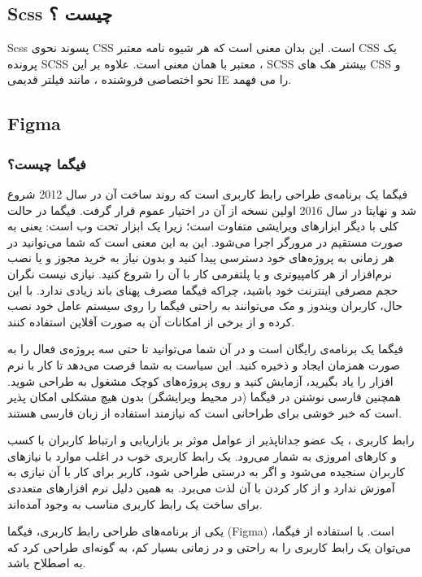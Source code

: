 \subsection{Scss چیست ؟}
Scss پسوند نحوی CSS است. این بدان معنی است که هر شیوه نامه معتبر CSS یک پرونده SCSS معتبر با همان معنی است. علاوه بر این ، SCSS بیشتر هک های CSS و نحو اختصاصی فروشنده ، مانند فیلتر قدیمی IE را می فهمد.


\subsection{Figma}
\subsubsection{فیگما چیست؟}
فیگما یک برنامه‌ی طراحی رابط کاربری است که روند ساخت آن در سال 2012 شروع شد و نهایتا در سال 2016 اولین نسخه از آن در اختیار عموم قرار گرفت. فیگما در حالت کلی با دیگر ابزارهای ویرایشی متفاوت است؛ زیرا یک ابزار تحت وب 
 است: یعنی به صورت مستقیم در مرورگر اجرا می‌شود. این به این معنی است که شما می‌توانید در هر زمانی به پروژه‌های خود دسترسی پیدا کنید و بدون نیاز به خرید مجوز و یا نصب نرم‌افزار از هر کامپیوتری و یا پلتفرمی کار با آن را شروع کنید. نیازی نیست نگران حجم مصرفی اینترنت خود باشید، چراکه فیگما مصرف پهنای باند زیادی ندارد. با این حال، کاربران ویندوز و مک می‌توانند به راحتی فیگما را روی سیستم عامل خود نصب کرده و از برخی از امکانات آن‌ به صورت آفلاین استفاده کنند.

فیگما یک برنامه‌ی رایگان است و در آن شما می‌توانید تا حتی سه پروژه‌ی فعال را به صورت همزمان ایجاد و ذخیره کنید. این سیاست به شما فرصت می‌دهد تا کار با نرم افزار را یاد بگیرید، آزمایش کنید و روی پروژه‌های کوچک مشغول به طراحی شوید. همچنین فارسی نوشتن در فیگما (در محیط ویرایشگر) بدون هیچ مشکلی امکان پذیر است که خبر خوشی برای طراحانی است که نیازمند استفاده از زبان فارسی هستند.

رابط کاربری 
، یک عضو جداناپذیر از عوامل موثر بر بازاریابی و ارتباط کاربران با کسب و کارهای امروزی به شمار می‌رود. یک رابط کاربری خوب در اغلب موارد با نیازهای کاربران سنجیده می‌شود و اگر به درستی طراحی شود، کاربر برای کار با آن نیازی به آموزش ندارد و از کار کردن با آن لذت می‌برد. به همین دلیل نرم افزارهای متعددی برای ساخت یک رابط کاربری مناسب به وجود آمده‌اند.

یکی از برنامه‌های طراحی رابط کاربری، فیگما (Figma) است. با استفاده از فیگما، می‌توان یک رابط کاربری را به راحتی و در زمانی بسیار کم، به گونه‌ای طراحی کرد که به اصطلاح 
 باشد.
